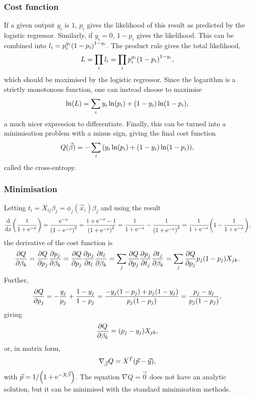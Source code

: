 \documentclass[11pt,british,a4paper]{article}
\renewcommand{\exp}[1]{\mathrm{e}^{#1}}
\numberwithin{equation}{section}
\begin{document}
\subsubsection{Cost function}
If a given output \(y_i\) is \(1\), \(p_i\) gives the likelihood of this result as predicted by the logistic regressor. Similarly, if \(y_i=0\), \(1-p_i\) gives the likelihood. This can be combined into \(l_i = p_i^{y_i} \qty(1-p_i)^{1-y_i}\). The product rule gives the total likelihood,
\begin{equation}
    L = \prod_{i} l_i = \prod_{i} p_i^{y_i} \qty(1-p_i)^{1-y_i},
\end{equation}
which should be maximised by the logistic regressor. Since the logarithm is a strictly monotonous function, one can instead choose to maximise
\begin{equation}
    \ln(L) = \sum_i y_i \ln(p_i) + \qty(1-y_i)\ln(1-p_i),
\end{equation}
a much nicer expression to differentiate. Finally, this can be turned into a minimisation problem with a minus sign, giving the final cost function
\begin{equation}
    Q(\vec{\beta}) = -\sum_i \qty(y_i\ln(p_i) + \qty(1-y_i)\ln(1-p_i)),
\end{equation}
called the cross-entropy.

\subsubsection{Minimisation}
Letting \(t_i=X_{ij}\beta_j = \phi_j(\vec{x}_i)\beta_j\) and using the result
\begin{equation}
    \dv{x}(\frac{1}{1+\exp{-x}}) = \frac{\exp{-x}}{\qty(1-\exp{-x})^2}
                                 = \frac{1 + \exp{-x} - 1}{\qty(1+\exp{-x})^2}
                                 = \frac{1}{1+\exp{-x}} - \frac{1}{\qty(1+\exp{-x})^2}
                                 = \frac{1}{1+\exp{-x}}\qty(1 - \frac{1}{1+\exp{-x}}),
\end{equation}
the derivative of the cost function is
\begin{equation}
    \pdv{Q}{\beta_k} = \pdv{Q}{p_j}\pdv{p_j}{\beta_k}
                     = \pdv{Q}{p_j}\pdv{p_j}{t_l}\pdv{t_l}{\beta_k}
                     = \sum_j \pdv{Q}{p_j}\pdv{p_j}{t_j}\pdv{t_j}{\beta_k}
                     = \sum_j \pdv{Q}{p_j}p_j\qty(1-p_j)X_{jk}.
\end{equation}
Further,
\begin{equation}
    \pdv{Q}{p_j} = - \frac{y_j}{p_j} + \frac{1-y_j}{1-p_j}
                 = \frac{-y_j\qty(1-p_j) + p_j\qty(1-y_j)}{p_j\qty(1-p_j)}
                 = \frac{p_j - y_j}{p_j\qty(1-p_j)},
\end{equation}
giving
\begin{equation}
    \pdv{Q}{\beta_k} = \qty(p_j - y_j) X_{jk},
\end{equation}
or, in matrix form,
\begin{equation}
    \nabla_{\vec{\beta}} Q = X^T \qty(\vec{p} - \vec{y}),
\end{equation}
with \(\vec{p} = 1/\qty(1+\exp{-X\vec{\beta}})\).
The equation \(\nabla Q = \vec{0}\) does not have an analytic solution, but it can be minimised with the standard minimisation methods.
\end{document}
